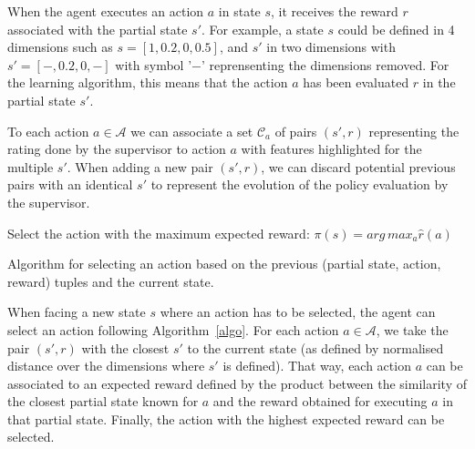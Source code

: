 \documentclass[letterpaper]{article} %
\begin{document}
When the agent executes an action $a$ in state $s$, it receives the reward $r$
associated with the partial state $s'$. For example, a state $s$ could be
defined in 4 dimensions such as ${s=[1,0.2,0,0.5]}$, and $s'$ in two dimensions
with ${s'=[-,0.2,0,-]}$ with symbol '$-$' reprensenting the dimensions removed.
For the learning algorithm, this means that the action $a$ has been evaluated
$r$ in the partial state $s'$.  

To each action $a \in \mathcal{A}$ we can associate a set $\mathcal{C}_{a}$ of
pairs $(s',r)$ representing the rating done by the supervisor to action $a$ with
features highlighted for the multiple $s'$. When adding a new pair $(s',r)$, we
can discard potential previous pairs with an identical $s'$ to represent the
evolution of the policy evaluation by the supervisor.

\begin{algorithm}
    \DontPrintSemicolon
    Select the action with the maximum expected reward:
    $\pi(s) = arg\, max_{a} \hat{r}(a)$

    \caption{Algorithm for selecting an action based on the previous
    (partial state, action, reward) tuples and the current state.}
    \label{algo}
\end{algorithm}



When facing a new state $s$ where an action has to be selected, the agent can
select an action following Algorithm~\ref{algo}. For each action $a \in
\mathcal{A}$, we take the pair $(s',r)$ with the closest $s'$ to the current
state (as defined by normalised distance over the dimensions where $s'$ is
defined). That way, each action $a$ can be associated to an expected reward
defined by the product between the similarity of the closest partial state known
for $a$ and the reward obtained for executing $a$ in that partial state.
Finally, the action with the highest expected reward can be selected.
\end{document}
